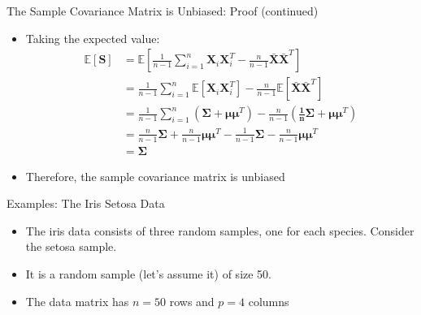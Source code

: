 \documentclass[
  ignorenonframetext,
]{beamer}
\providecommand{\tightlist}{%
  \setlength{\itemsep}{0pt}\setlength{\parskip}{0pt}}
\begin{document}
\begin{frame}{The Sample Covariance Matrix is Unbiased: Proof
(continued)}
\protect\hypertarget{the-sample-covariance-matrix-is-unbiased-proof-continued}{}
\begin{itemize}
\tightlist
\item
  Taking the expected value: \[
  \begin{aligned}
  \mathbb{E}[\mathbf{S}] &= \mathbb{E}\left[\frac{1}{n-1}\sum_{i=1}^n \mathbf{X}_i \mathbf{X}_i^T - \frac{n}{n-1}\bar{\mathbf{X}} \bar{\mathbf{X}}^T\right] \\
  &= \frac{1}{n-1}\sum_{i=1}^n \mathbb{E}[\mathbf{X}_i \mathbf{X}_i^T] - \frac{n}{n-1}\mathbb{E}[\bar{\mathbf{X}} \bar{\mathbf{X}}^T] \\
  &= \frac{1}{n-1}\sum_{i=1}^n (\boldsymbol{\Sigma} + \boldsymbol{\mu}\boldsymbol{\mu}^T) - \frac{n}{n-1}(\boldsymbol{\frac{1}{n}\Sigma} + \boldsymbol{\mu}\boldsymbol{\mu}^T) \\
  &= \frac{n}{n-1}\boldsymbol{\Sigma} + \frac{n}{n-1}\boldsymbol{\mu}\boldsymbol{\mu}^T - \frac{1}{n-1}\boldsymbol{\Sigma} - \frac{n}{n-1}\boldsymbol{\mu}\boldsymbol{\mu}^T \\
  &= \boldsymbol{\Sigma}
  \end{aligned}
  \]
\item
  Therefore, the sample covariance matrix is unbiased
\end{itemize}
\end{frame}

\begin{frame}{Examples: The Iris Setosa Data}
\protect\hypertarget{examples-the-iris-setosa-data}{}
\begin{itemize}
\tightlist
\item
  The iris data consists of three random samples, one for each species.
  Consider the setosa sample.
\item
  It is a random sample (let's assume it) of size 50.
\item
  The data matrix has \(n=50\) rows and \(p=4\) columns
\end{itemize}
\end{frame}
\end{document}
